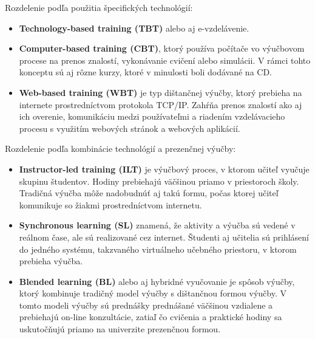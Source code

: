 \documentclass[10pt,oneside,slovak,a4paper]{article}
\begin{document}
Rozdelenie podľa použitia špecifických technológií:
\begin{itemize}
	\item \textbf{Technology-based training (TBT)} alebo aj e-vzdelávenie. %
	\item \textbf{Computer-based training (CBT)}, ktorý používa počítače vo výučbovom procese na prenos znalostí, vykonávanie cvičení alebo simulácii. V rámci tohto konceptu sú aj rôzne kurzy, ktoré v minulosti boli dodávané na CD.
	\item \textbf{Web-based training (WBT)} je typ dištančnej výučby, ktorý prebieha na internete prostredníctvom protokola TCP/IP. Zahŕňa prenos znalostí ako aj ich overenie, komunikáciu medzi používateľmi a riadením vzdelávacieho procesu s využitím webových stránok a webových aplikácií.
\end{itemize}


Rozdelenie podľa kombinácie technológií a prezenčnej výučby:
\begin{itemize}
	\item \textbf{Instructor-led training (ILT)} je výučbový proces, v ktorom učiteľ vyučuje skupinu študentov. Hodiny prebiehajú väčšinou priamo v priestoroch školy. Tradičná výučba môže nadobudnúť aj takú formu, počas ktorej učiteľ komunikuje so žiakmi prostredníctvom internetu.
	\item \textbf{Synchronous learning (SL)} znamená, že aktivity a výučba sú vedené v reálnom čase, ale sú realizované cez internet. Študenti aj učitelia sú prihlásení do jedného systému, takzvaného virtuálneho učebného priestoru, v ktorom prebieha výučba.
	\item \textbf{Blended learning (BL)} alebo aj hybridné vyučovanie je spôsob výučby, ktorý kombinuje tradičný model výučby s dištančnou formou výučby. V tomto modeli výučby sú prednášky prednášané väčšinou vzdialene a prebiehajú on-line konzultácie, zatiaľ čo cvičenia a praktické hodiny sa uskutočňujú priamo na univerzite prezenčnou formou.
\end{itemize}
\end{document}
